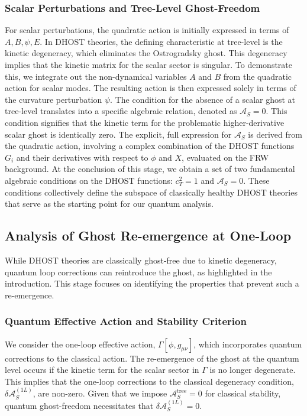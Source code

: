 \documentclass[twocolumn]{aastex631}
\begin{document}
\subsubsection{Scalar Perturbations and Tree-Level Ghost-Freedom}
For scalar perturbations, the quadratic action is initially expressed in terms of $A, B, \psi, E$. In DHOST theories, the defining characteristic at tree-level is the kinetic degeneracy, which eliminates the Ostrogradsky ghost. This degeneracy implies that the kinetic matrix for the scalar sector is singular. To demonstrate this, we integrate out the non-dynamical variables $A$ and $B$ from the quadratic action for scalar modes. The resulting action is then expressed solely in terms of the curvature perturbation $\psi$. The condition for the absence of a scalar ghost at tree-level translates into a specific algebraic relation, denoted as $\mathcal{A}_S = 0$. This condition signifies that the kinetic term for the problematic higher-derivative scalar ghost is identically zero. The explicit, full expression for $\mathcal{A}_S$ is derived from the quadratic action, involving a complex combination of the DHOST functions $G_i$ and their derivatives with respect to $\phi$ and $X$, evaluated on the FRW background.
At the conclusion of this stage, we obtain a set of two fundamental algebraic conditions on the DHOST functions: $c_T^2=1$ and $\mathcal{A}_S=0$. These conditions collectively define the subspace of classically healthy DHOST theories that serve as the starting point for our quantum analysis.

\subsection{Analysis of Ghost Re-emergence at One-Loop}
While DHOST theories are classically ghost-free due to kinetic degeneracy, quantum loop corrections can reintroduce the ghost, as highlighted in the introduction. This stage focuses on identifying the properties that prevent such a re-emergence.

\subsubsection{Quantum Effective Action and Stability Criterion}
We consider the one-loop effective action, $\Gamma[\phi, g_{\mu\nu}]$, which incorporates quantum corrections to the classical action. The re-emergence of the ghost at the quantum level occurs if the kinetic term for the scalar sector in $\Gamma$ is no longer degenerate. This implies that the one-loop corrections to the classical degeneracy condition, $\delta\mathcal{A}_S^{(1L)}$, are non-zero. Given that we impose $\mathcal{A}_S^{\text{tree}} = 0$ for classical stability, quantum ghost-freedom necessitates that $\delta\mathcal{A}_S^{(1L)} = 0$.
\end{document}
